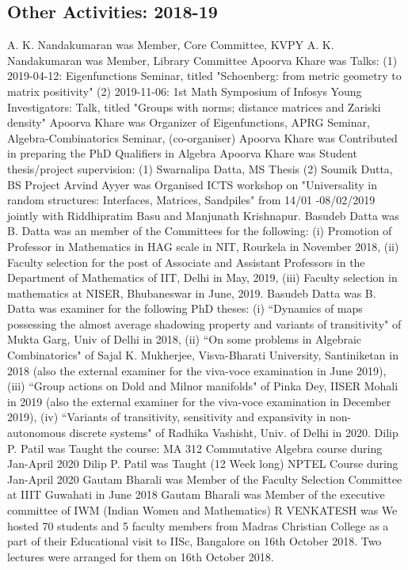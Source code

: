 \subsection{Other Activities: 2018-19}
\begin{enumerate}
A. K. Nandakumaran was Member, Core Committee, KVPY
A. K. Nandakumaran was Member, Library Committee
Apoorva Khare was Talks: (1) 2019-04-12: Eigenfunctions Seminar, titled "Schoenberg: from metric geometry to matrix positivity" (2) 2019-11-06: 1st Math Symposium of Infosys Young Investigators: Talk, titled "Groups with norms; distance matrices and Zariski density"
Apoorva Khare was Organizer of Eigenfunctions,  APRG Seminar, Algebra-Combinatorics Seminar, (co-organiser)
Apoorva Khare was Contributed in preparing the PhD Qualifiers in Algebra
Apoorva Khare was Student thesis/project supervision: (1) Swarnalipa Datta, MS Thesis (2) Soumik Dutta, BS Project
Arvind Ayyer was Organised ICTS workshop on "Universality in random structures: Interfaces, Matrices, Sandpiles" from 14/01 -08/02/2019 jointly with Riddhipratim Basu and Manjunath Krishnapur.
Basudeb Datta was B. Datta was an member of the Committees for the following: (i)  Promotion of Professor in Mathematics in HAG scale in NIT, Rourkela in November 2018, (ii) Faculty selection for the post of Associate and Assistant Professors in the Department of Mathematics of IIT, Delhi in May, 2019, (iii) Faculty selection in mathematics at NISER, Bhubaneswar in June, 2019.
Basudeb Datta was B. Datta was  examiner for the following PhD theses:  (i) ``Dynamics of maps possessing the almost average shadowing property and variants of transitivity" of Mukta Garg, Univ of Delhi in 2018, (ii) ``On some problems in Algebraic Combinatorics" of Sajal K. Mukherjee, Visva-Bharati University, Santiniketan in 2018 (also the external examiner for the viva-voce examination  in June 2019), (iii) ``Group actions on Dold and Milnor manifolds" of Pinka Dey, IISER Mohali in 2019 (also the external examiner for the viva-voce examination in December 2019), (iv) ``Variants of transitivity, sensitivity and expansivity in non-autonomous discrete systems" of Radhika Vashisht,  Univ. of Delhi in 2020. 
Dilip P. Patil was Taught the course: MA 312 Commutative Algebra course during Jan-April 2020
Dilip P. Patil was Taught  (12 Week long)  NPTEL Course during Jan-April 2020
Gautam Bharali was Member of the Faculty Selection Committee at IIIT Guwahati in June 2018
Gautam Bharali was Member of the executive committee of IWM (Indian Women and Mathematics)  
R VENKATESH was We hosted 70 students and 5 faculty members from Madras Christian College as a part of their Educational visit to IISc, Bangalore on 16th October 2018. Two lectures were arranged for them on 16th October 2018. 

\end{enumerate}
